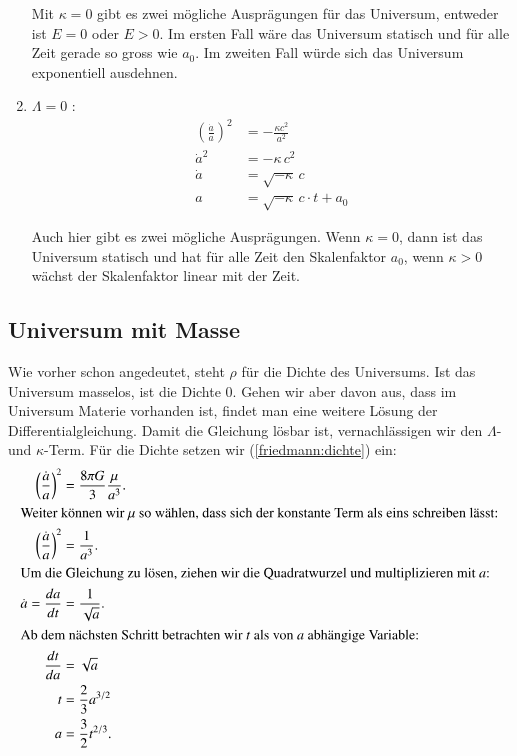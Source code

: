 \begin{refsection}
\begin{enumerate}
	
Mit $\kappa = 0$ gibt es zwei mögliche Ausprägungen für das Universum, entweder ist $E = 0$ oder $E > 0$. Im ersten Fall wäre das Universum statisch und für alle Zeit gerade so gross wie $a_0$. Im zweiten Fall würde sich das Universum exponentiell ausdehnen.
		
	\item $\Lambda = 0$ :
		\begin{align}
			\nonumber \left(\frac{\dot{a}}{a}\right) ^2 &= - \frac{\kappa c^2}{a^2}\\
			\nonumber \dot{a} ^2 &= - \kappa \, c^2 \\
			\nonumber \dot{a} &= \sqrt{- \kappa}\, c \\
			a &= \sqrt{- \kappa}\, c \cdot t + a_0\label{friedmann:Kappa}
		\end{align}
		
Auch hier gibt es zwei mögliche Ausprägungen. Wenn $\kappa = 0$, dann ist das Universum statisch und hat für alle Zeit den Skalenfaktor $a_{0}$, wenn $\kappa > 0$ wächst der Skalenfaktor linear mit der Zeit.
	
\end{enumerate}

\subsection{Universum mit Masse \label{friedmann:UniversumMitMasse}} 
Wie vorher schon angedeutet, steht $\rho$ für die Dichte des Universums. Ist das Universum masselos, ist die Dichte 0. Gehen wir aber davon aus, dass im Universum Materie vorhanden ist, findet man eine weitere Lösung der Differentialgleichung. Damit die Gleichung lösbar ist, vernachlässigen wir den $\Lambda$- und $\kappa$-Term. Für die Dichte setzen wir (\ref{friedmann:dichte}) ein:
\begin{align}
	\nonumber\left(\frac{\dot{a}}{a}\right) ^2 &= \frac{8 \pi G}{3} \frac{\mu}{a^3}. \\
	\intertext{Weiter können wir $\mu$ so wählen, dass sich der konstante Term als eins schreiben lässt:}
	\nonumber \left(\frac{\dot{a}}{a}\right) ^2 &= \frac{1}{a^3}. \\
	\intertext{Um die Gleichung zu lösen, ziehen wir die Quadratwurzel und multiplizieren mit $a$:}
	\nonumber \dot{a} = \frac{da}{dt} &=\frac{1}{\sqrt{a}}. \\
	\intertext{Ab dem nächsten Schritt betrachten wir $t$ als von $a$ abhängige Variable:}
	\nonumber \frac{dt}{da} &= \sqrt{a} \\
	\nonumber t &= \frac{2}{3} a^{3/2} \\
	a &= \frac{3}{2} t^{2/3}. \label{friedmann:Masse}
\end{align}


\end{refsection}

